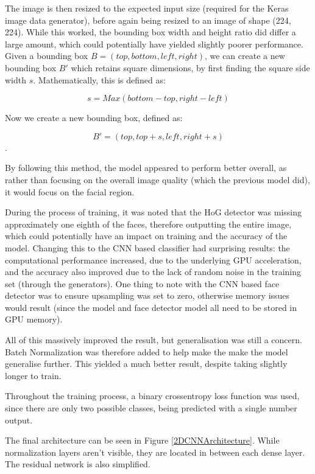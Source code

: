 \documentclass[10pt,a4paper]{article}
\begin{document}
        The image is then resized to the expected input size (required for the Keras image data generator), before again being resized to an image of shape (224, 224).
        While this worked, the bounding box width and height ratio did differ a large amount, which could potentially have yielded slightly poorer performance.
        Given a bounding box $B = (top, bottom, left, right)$, we can create a new bounding box $B'$ which retains square dimensions, by first finding the square
        side width $s$. Mathematically, this is defined as:

        $$s = Max(bottom - top, right - left)$$

        Now we create a new bounding box, defined as:

        $$B' = (top, top + s, left, right + s)$$.

        By following this method, the model appeared to perform better overall, as rather than focusing on the overall image quality (which the previous model did),
        it would focus on the facial region.

        During the process of training, it was noted that the HoG detector was missing approximately one eighth of the faces, therefore outputting the entire image, which
        could potentially have an impact on training and the accuracy of the model. Changing this to the CNN based classifier had surprising results: the computational performance increased,
        due to the underlying GPU acceleration, and the accuracy also improved due to the lack of random noise in the training set (through the generators). One thing to note with the CNN based
        face detector was to ensure upsampling was set to zero, otherwise memory issues would result (since the model and face detector model all need to be stored in GPU memory).
        
        All of this massively improved the result, but generalisation was still a concern. Batch Normalization was therefore added to help make the make the model generalise further.
        This yielded a much better result, despite taking slightly longer to train. 

        Throughout the training process, a binary crossentropy loss function was used, since there are only two possible classes, being predicted with a single number output. 

        The final architecture can be seen in Figure \ref{2DCNNArchitecture}. While normalization layers aren't visible, they are located in between each dense layer. The residual network
        is also simplified.
\end{document}
